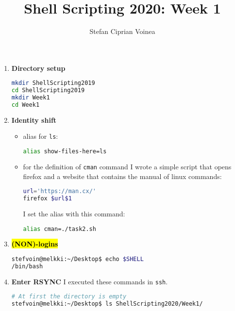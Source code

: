 \documentclass[9pt]{article}
\begin{document}
\title{Shell Scripting 2020: Week 1}
\author{Stefan Ciprian Voinea}
\maketitle


\begin{enumerate}
	\item \textbf{Directory setup}
		\begin{lstlisting}[language=bash]
mkdir ShellScripting2019
cd ShellScripting2019
mkdir Week1
cd Week1
		\end{lstlisting}

	\item \textbf{Identity shift}
		\begin{itemize}
			\item alias for \texttt{ls}:
			\begin{lstlisting}[language=bash]
alias show-files-here=ls
			\end{lstlisting}
			\item for the definition of \texttt{cman} command I wrote a simple script that opens firefox and a website that contains the manual of linux commands:
			\begin{lstlisting}[language=bash]
url='https://man.cx/'
firefox $url$1 
			\end{lstlisting}
			I set the alias with this command:
			\begin{lstlisting}[language=bash]
alias cman=./task2.sh
			\end{lstlisting}
		\end{itemize}


	\item \hl{\textbf{(NON)-logins}}
		\begin{lstlisting}[language=bash]
stefvoin@melkki:~/Desktop$ echo $SHELL
/bin/bash		
		\end{lstlisting}

	\item \textbf{Enter RSYNC}
		I executed these commands in \texttt{ssh}.
		\begin{lstlisting}[language=bash,breaklines=true]
# At first the directory is empty
stefvoin@melkki:~/Desktop$ ls ShellScripting2020/Week1/


\end{lstlisting}
\end{enumerate}
\end{document}
